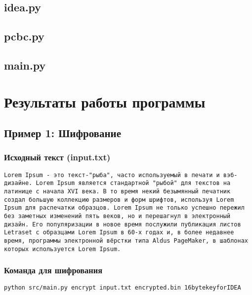 \documentclass[a4paper, 14pt]{report}
\begin{document}
\section{idea.py}


\section{pcbc.py}


\section{main.py}

\chapter{Результаты работы программы}

\section{Пример 1: Шифрование}

\subsection{Исходный текст (input.txt)}
\begin{lstlisting}
Lorem Ipsum - это текст-"рыба", часто используемый в печати и вэб-дизайне. Lorem Ipsum является стандартной "рыбой" для текстов на латинице с начала XVI века. В то время некий безымянный печатник создал большую коллекцию размеров и форм шрифтов, используя Lorem Ipsum для распечатки образцов. Lorem Ipsum не только успешно пережил без заметных изменений пять веков, но и перешагнул в электронный дизайн. Его популяризации в новое время послужили публикация листов Letraset с образцами Lorem Ipsum в 60-х годах и, в более недавнее время, программы электронной вёрстки типа Aldus PageMaker, в шаблонах которых используется Lorem Ipsum.
\end{lstlisting}


\subsection{Команда для шифрования}
\begin{lstlisting}[language=bash]
python src/main.py encrypt input.txt encrypted.bin 16bytekeyforIDEA
\end{lstlisting}
\end{document}
